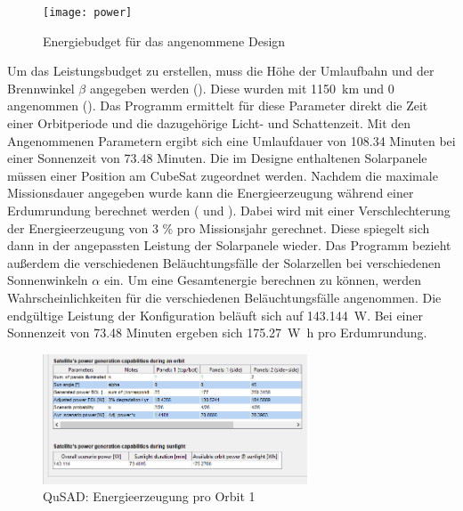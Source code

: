 										\begin{figure}[H]
											\centering
												\texttt{[image: power]}
											\caption{Energiebudget für das angenommene Design}
											\label{fig:power}
										\end{figure}
Um das Leistungsbudget zu erstellen, muss die Höhe der Umlaufbahn und der Brennwinkel $\beta$ angegeben werden (). Diese wurden mit \SI{1150}{\kilo\metre} und 0\textdegree{} angenommen ().  Das Programm ermittelt für diese Parameter direkt die Zeit einer Orbitperiode und die dazugehörige Licht- und Schattenzeit. Mit den Angenommenen Parametern ergibt sich eine Umlaufdauer von \num{108,34} Minuten bei einer Sonnenzeit von \num{73,48} Minuten. Die im Designe enthaltenen Solarpanele müssen einer Position am CubeSat zugeordnet werden.
Nachdem die maximale Missionsdauer angegeben wurde kann die Energieerzeugung während einer Erdumrundung berechnet werden ( und ). Dabei wird mit einer  Verschlechterung der Energieerzeugung von \num{3} \% pro Missionsjahr gerechnet. Diese spiegelt sich dann in der angepassten Leistung der Solarpanele wieder. Das Programm bezieht außerdem die verschiedenen Beläuchtungsfälle der Solarzellen bei verschiedenen Sonnenwinkeln $\alpha$ ein. Um eine Gesamtenergie berechnen zu können,  werden Wahrscheinlichkeiten für die verschiedenen Beläuchtungsfälle angenommen. Die endgültige Leistung der Konfiguration beläuft sich auf \SI{143,144}{\watt}. Bei einer Sonnenzeit von \num{73,48} Minuten ergeben sich \SI{175,27}{\watt\hour} pro Erdumrundung. 
			
			\begin{figure}[H]
				\centering
					\includegraphics[width=0.70\textwidth]{graphics/power3.png}
				\caption{QuSAD: Energieerzeugung pro Orbit 1}
				\label{fig:power3}
			\end{figure}
			
